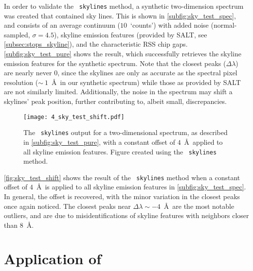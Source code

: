 In order to validate the \stops\ \texttt{skylines} method, a synthetic two-dimension spectrum was created that contained sky lines. This is shown in \autoref{subfig:sky_test_spec}, and consists of an average continuum ($10$~`counts') with added noise (normal-sampled, $\sigma = 4.5$), skyline emission features (provided by \gls{SALT}, see \autoref{subsec:stops_skyline}), and the characteristic \gls{RSS} chip gaps.
\autoref{subfig:sky_test_pure} shows the result, which successfully retrieves the skyline emission features for the synthetic spectrum.
Note that the closest peaks ($\Delta \lambda$) are nearly never $0$, since the skylines are only as accurate as the spectral pixel resolution ($\sim~1$~\AA\ in our synthetic spectrum) while those as provided by \gls{SALT} are not similarly limited.
Additionally, the noise in the spectrum may shift a skylines' peak position, further contributing to, albeit small, discrepancies.

\begin{figure}[t]
    \centering
    \texttt{[image: 4\_sky\_test\_shift.pdf]}
    \caption{The \stops\ \texttt{skylines} output for a two-dimensional spectrum, as described in \autoref{subfig:sky_test_pure}, with a constant offset of $4$~\AA\ applied to all skyline emission features. Figure created using the \stops\ \texttt{skylines} method.}
    \label{fig:sky_test_shift}
\end{figure}

\autoref{fig:sky_test_shift} shows the result of the \stops\ \texttt{skylines} method when a constant offset of $4$~\AA\ is applied to all skyline emission features in \autoref{subfig:sky_test_spec}.
In general, the offset is recovered, with the minor variation in the closest peaks once again noticed.
The closest peaks near $\Delta \lambda \sim -4$~\AA\ are the most notable outliers, and are due to misidentifications of skyline features with neighbors closer than $8$~\AA.

\section[Application of \textsc{stops}]{Application of \stops} \label{sec:app_stops}

